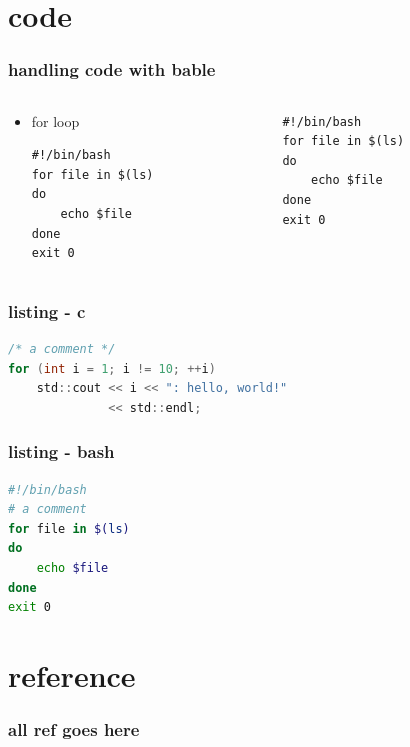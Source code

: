 \documentclass[bigger, presentation]{beamer}
\begin{document}
\section{code}
\label{sec-7}
\begin{frame}[fragile]
\frametitle{handling code with bable}
\label{sec-7-1}
\begin{columns}
\begin{column}{0.5\textwidth}
\begin{itemize}

\item for loop\\
\label{sec-7-1-1}%
\begin{verbatim}
#!/bin/bash
for file in $(ls)
do
    echo $file
done
exit 0
\end{verbatim}

\end{itemize} %
\end{column}
\begin{column}{0.5\textwidth}
\begin{example}
\label{sec-7-1-2}


\begin{verbatim}
#!/bin/bash
for file in $(ls)
do
    echo $file
done
exit 0
\end{verbatim}
\end{example}
\end{column}
\end{columns}
\end{frame}
\begin{frame}[fragile]
\frametitle{listing - c}
\label{sec-7-2}

\begin{lstlisting}[language=c]
/* a comment */
for (int i = 1; i != 10; ++i)
    std::cout << i << ": hello, world!"
              << std::endl;
\end{lstlisting}
\end{frame}
\begin{frame}[fragile]
\frametitle{listing - bash}
\label{sec-7-3}

\begin{lstlisting}[language=bash]
#!/bin/bash
# a comment
for file in $(ls)
do
    echo $file
done
exit 0
\end{lstlisting}
\end{frame}
\section{reference}
\label{sec-8}
\begin{frame}
\frametitle{all ref goes here}
\label{sec-8-1}
\end{frame}
\end{document}
